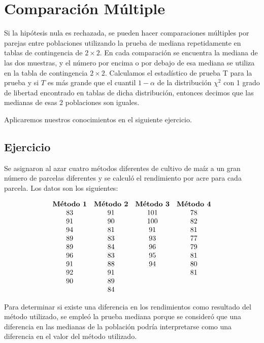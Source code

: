 \documentclass[
  a4paper,
  oneside,
  openany]{book}
\begin{document}
\hypertarget{comparaciuxf3n-muxfaltiple-1}{%
\section{Comparación Múltiple}\label{comparaciuxf3n-muxfaltiple-1}}

Si la hipótesis nula es rechazada, se pueden hacer comparaciones múltiples por parejas entre poblaciones utilizando la prueba de mediana repetidamente en tablas de contingencia de \(2 \times 2\). En cada comparación se encuentra la mediana de las dos muestras, y el número por encima o por debajo de esa mediana se utiliza en la tabla de contingencia \(2 \times 2\). Calculamos el estadístico de prueba T para la prueba y si \(T\) es más grande que el cuantil \(1-\alpha\) de la distribución \(\chi^2\) con 1 grado de libertad encontrado en tablas de dicha distribución, entonces decimos que las medianas de esas 2 poblaciones son iguales.

Aplicaremos nuestros conocimientos en el siguiente ejercicio.

\hypertarget{ejercicio-2}{%
\subsection{Ejercicio}\label{ejercicio-2}}

Se asignaron al azar cuatro métodos diferentes de cultivo de maíz a un gran número de parcelas diferentes y se calculó el rendimiento por acre para cada parcela. Los datos son los siguientes:

\[
\begin{array}{ c c c c c } 
\textbf{Método 1} & \textbf{Método 2} & \textbf{Método 3} & \textbf{Método 4} \\ 
83 & 91 &101  &78  \\ 
91 & 90 &100 &82 \\
94 & 81 &91  &81  \\
89 & 83 &93  &77  \\
89 & 84 &96  &79 \\
96 & 83 &95 &81 \\
91 & 88 &94  &80 \\
92 & 91 & & 81 \\
90 & 89 & &  \\
   & 84 &  &  \\
\end{array}
\]

Para determinar si existe una diferencia en los rendimientos como resultado del método utilizado, se empleó la prueba mediana porque se consideró que una diferencia en las medianas de la población podría interpretarse como una diferencia en el valor del método utilizado.
\end{document}
